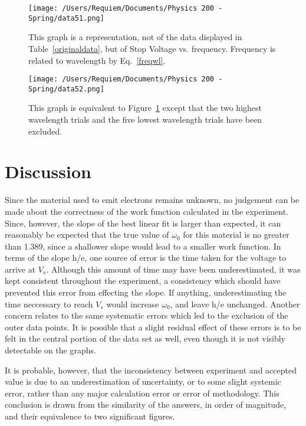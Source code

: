 \documentclass[aps,pre,twocolumn,nofootinbib]{revtex4}
\begin{document}
\begin{figure}[h]
\centering
\texttt{[image: /Users/Requiem/Documents/Physics 200 - Spring/data51.png]} 
\caption{This graph is a representation, not of the data displayed in Table~\ref{originaldata}, but of Stop Voltage vs. frequency.  Frequency is related to wavelength by Eq.~\ref{freqwl}. }
\label{graph1}
\end{figure}

\begin{figure}[h]
\centering
\texttt{[image: /Users/Requiem/Documents/Physics 200 - Spring/data52.png]} 
\caption{This graph is equivalent to Figure~\ref{graph1} except that the two highest wavelength trials and the five lowest wavelength trials have been excluded. }
\label{graph2}
\end{figure}

\section{Discussion}

Since the material used to emit electrons remains unknown, no judgement can be made about the correctness of the work function calculated in the experiment.  Since, however, the slope of the best linear fit is larger than expected, it can reasonably be expected that the true value of $\omega_0$ for this material is no greater than 1.389, since a shallower slope would lead to a smaller work function.  In terms of the slope h/e, one source of error is the time taken for the voltage to arrive at $V_s$.  Although this amount of time may have been underestimated, it was kept consistent throughout the experiment, a consistency which should have prevented this error from effecting the slope.  If anything, underestimating the time neccessary to reach $V_s$ would increase $\omega_0$, and leave h/e unchanged.  Another concern relates to the same systematic errors which led to the exclusion of the outer data points.  It is possible that a slight residual effect of these errors is to be felt in the central portion of the data set as well, even though it is not visibly detectable on the graphs.  

It is probable, however, that the inconsistency between experiment and accepted value is due to an underestimation of uncertainty, or to some slight systemic error, rather than any major calculation error or error of methodology.  This conclusion is drawn from the similarity of the answers, in order of magnitude, and their equivalence to two significant figures.  
\end{document}
